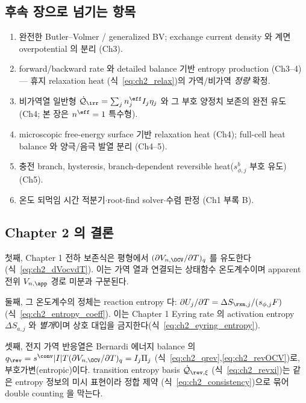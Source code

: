 \subsection{후속 장으로 넘기는 항목}\label{sec:ch2_transmit}
\begin{enumerate}[label=\arabic*),leftmargin=2.0em]
\item 완전한 Butler--Volmer / generalized BV; exchange current density 와 계면 overpotential 의 분리 (Ch3).
\item forward/backward rate 와 detailed balance 기반 entropy production (Ch3--4) — 휴지 relaxation heat
  (식~\eqref{eq:ch2_relax})의 가역/비가역 \emph{정량} 확정.
\item 비가역열 일반형 $\dot{\mathcal Q}_{\irr}=\sum_j n_j^{\eff}I_j\eta_j$ 와 그 부호 양정치 보존의 완전 유도
  (Ch4; 본 장은 $n^\eff=1$ 특수형).
\item microscopic free-energy surface 기반 relaxation heat (Ch4); full-cell heat balance 와 양극/음극 발열
  분리 (Ch4--5).
\item 충전 branch, hysteresis, branch-dependent reversible heat($s_{\phi,j}^b$ 부호 유도) (Ch5).
\item 온도 되먹임 시간 적분기$\cdot$root-find solver$\cdot$수렴 판정 (Ch1 부록 B).
\end{enumerate}

\subsection{Chapter 2 의 결론}\label{sec:ch2_concl}
첫째, Chapter 1 전하 보존식은 평형에서 $(\partial V_{n,\OCV}/\partial T)_q$ 를 유도한다(식~\eqref{eq:ch2_dVocvdT}).
이는 가역 열과 연결되는 상태함수 온도계수이며 apparent 전위 $V_{n,\app}$ 경로 미분과 구분된다.

둘째, 그 온도계수의 정체는 reaction entropy 다: $\partial U_j/\partial T=\Delta S_{\rxn,j}/(s_{\phi,j}F)$
(식~\eqref{eq:ch2_entropy_coeff}). 이는 Chapter 1 Eyring rate 의 activation entropy $\Delta S_{a,j}$ 와
\emph{별개}이며 상호 대입을 금지한다(식~\eqref{eq:ch2_eyring_entropy}).

셋째, 전지 가역 반응열은 Bernardi 에너지 balance 의 $q_\rev=s^{\conv}|I|T(\partial V_{n,\OCV}/\partial T)_q
=I_j\Pi_j$ (식~\eqref{eq:ch2_qrev},\eqref{eq:ch2_revOCV})로, 부호가변(entropic)이다. transition entropy basis
$\dot{\mathcal Q}_{\rev,\xi}$ (식~\eqref{eq:ch2_revxi})는 같은 entropy 정보의 미시 표현이라 정합 제약
(식~\eqref{eq:ch2_consistency})으로 묶어 double counting 을 막는다.

